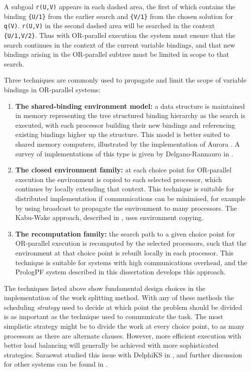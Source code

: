 A subgoal \texttt{r(U,V)} appears in each dashed area, the first of which 
contains the binding \texttt{\{U/1\}} from the earlier search and \texttt{\{V/1\}}
from the chosen solution for \texttt{q(V)}.  \texttt{r(U,V)} in
the second dashed area will be searched in the context
\texttt{\{U/1,V/2\}}.
Thus with OR-parallel execution the system must ensure that the search continues
in the context of the current variable bindings, and that new bindings arising in
the OR-parallel subtree must be limited in scope to that search.

Three techniques are commonly used to propagate and limit the scope of variable
bindings in OR-parallel systems:
\begin{enumerate}
\item{\textbf{The shared-binding environment model:}
  a data structure is maintained in
  memory representing the tree structured binding hierarchy as the search is
  executed, with each processor building their new bindings and referencing
  existing bindings higher up the structure.  This model is better suited to
  shared memory computers, illustrated by the implementation of Aurora
  \cite{LWH+90}.  A survey of implementations of this type is given by
  Delgano-Rannauro in \cite{DR92}.}
\item{\textbf{The closed environment family:}
  at each choice point for OR-parallel
  execution the environment is copied to each selected processor, which
  continues by locally extending that context.  This technique is suitable for
  distributed implementation if communications can be minimised, for example
  by using broadcast to propagate the environment to many processors.  The Kabu-Wake
  approach, described in \cite{MKI+86}, uses environment copying.}
\item{\textbf{The recomputation family:}
  the search path to a given choice point for
  OR-parallel execution is recomputed by the selected processors, such that
  the environment at that choice point is rebuilt locally in each processor.
  This technique is suitable for systems with high communications overhead, and
  the PrologPF system described in this dissertation develops this approach.}
\end{enumerate}

The techniques listed above show fundamental design choices in the implementation
of the work splitting method.  With any of these methods the scheduling
\textit{strategy}
used to decide at which point the problem should be divided is as
important as the technique used to communicate the task.
The most simplistic strategy might be to divide the work at every choice point, to
as many processors as there are alternate clauses.  However, more efficient
execution with better load balancing will generally be achieved with more sophisticated
strategies.  Saraswat studied this issue with DelphiKS in \cite{Sar95},
and further discussion for other systems can be found in \cite{AKM91, Bea91}.

